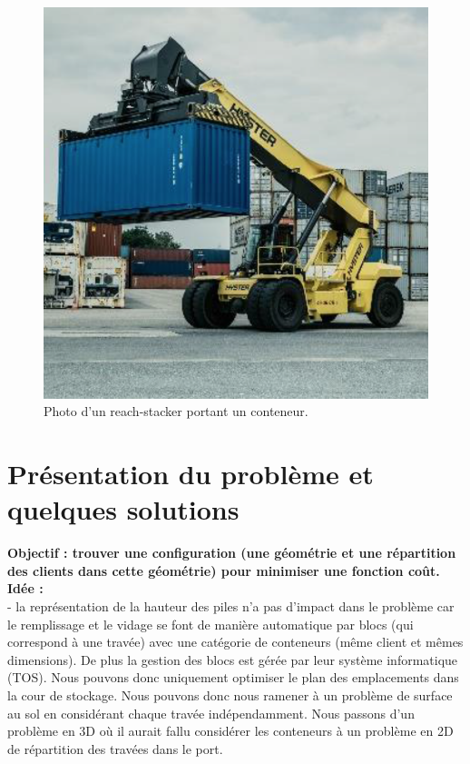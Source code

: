 \documentclass{article}
\begin{document}
\begin{figure}[!htb]
\centering
\includegraphics[width=0.7\linewidth]{images/PAS_stacker.png}
\caption{Photo d'un reach-stacker portant un conteneur.}
\label{fig:pas_satellite}
\end{figure}





\section{Présentation du problème et quelques solutions}

\textbf{Objectif : trouver une configuration (une géométrie et une répartition des clients dans cette géométrie) pour minimiser une fonction coût.} \\

\noindent
{\bf Idée :} \\
- la représentation de la hauteur des piles n'a pas d'impact dans le problème car le remplissage et le vidage se font de manière automatique par blocs (qui correspond à une travée) 
avec une catégorie de conteneurs (même client et mêmes dimensions). De plus la gestion des blocs est gérée par leur système informatique (TOS). Nous pouvons donc uniquement optimiser le plan des emplacements dans la cour de stockage.
Nous pouvons donc nous ramener à un problème de surface au sol en considérant chaque travée indépendamment. 
Nous passons d'un problème en 3D où il aurait fallu considérer les conteneurs à un problème en 2D de répartition des travées dans le port. \\
\end{document}
